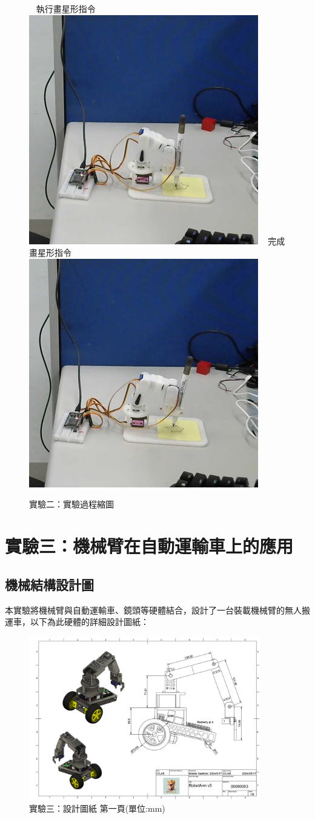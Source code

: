 \documentclass[class=NCU_thesis, crop=false]{standalone}
\begin{document}
\begin{figure}[h]
    ~    
    \subcaptionbox
        {執行畫星形指令
        \label{fig:fig-dataset-contrast-after-adjustment}}
        {\includegraphics[width=0.4\linewidth]{figures/star_0.jpg}}
    ~
    \subcaptionbox
        {完成畫星形指令
        \label{fig:fig-dataset-contrast-after-adjustment}}
        {\includegraphics[width=0.4\linewidth]{figures/star_1.jpg}}   
\caption{實驗二：實驗過程縮圖}
\end{figure}

\section{實驗三：機械臂在自動運輸車上的應用}
\subsection{機械結構設計圖}
本實驗將機械臂與自動運輸車、鏡頭等硬體結合，設計了一台裝載機械臂的無人搬運車，以下為此硬體的詳細設計圖紙：
\begin{figure}[htbp]
    \centering
    \includegraphics[width=0.9\textwidth]{figures/Armv3 (1).PNG}
    \caption{實驗三：設計圖紙 第一頁(單位:mm)}
    \label{fig:Armv3Drawing_p1}
\end{figure}
\end{document}
